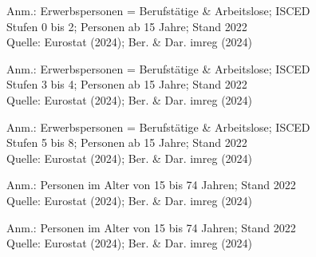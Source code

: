 \begin{figure}[p]
	{\centering {}}
	\label{map:erwerbspersniedrig}
	\begin{spacing}{1} \scriptsize
		Anm.: Erwerbspersonen = Berufstätige \& Arbeitslose; ISCED Stufen 0 bis 2; Personen ab 15 Jahre; Stand 2022\\
		Quelle: Eurostat (2024); Ber. \& Dar. imreg (2024) \end{spacing}
\end{figure}


\begin{figure}[p]
	{\centering {}}
	\label{map:erwerbspersmittel}
	\begin{spacing}{1} \scriptsize
		Anm.: Erwerbspersonen = Berufstätige \& Arbeitslose; ISCED Stufen 3 bis 4; Personen ab 15 Jahre; Stand 2022\\
		Quelle: Eurostat (2024); Ber. \& Dar. imreg (2024) \end{spacing}
\end{figure}


\begin{figure}[p]
	{\centering {}}
	\label{map:erwerbspershoch}
	\begin{spacing}{1} \scriptsize
		Anm.: Erwerbspersonen = Berufstätige \& Arbeitslose; ISCED Stufen 5 bis 8; Personen ab 15 Jahre; Stand 2022\\
		Quelle: Eurostat (2024); Ber. \& Dar. imreg (2024) \end{spacing}
\end{figure}


\begin{figure}[p]
	{\centering {}}
	\label{map:arbeitslosenquote}
	\begin{spacing}{1} \scriptsize
		Anm.: Personen im Alter von 15 bis 74 Jahren; Stand 2022\\
		Quelle: Eurostat (2024); Ber. \& Dar. imreg (2024) \end{spacing}
\end{figure}


\begin{figure}[p]
	{\centering {}}
	\label{map:arbeitslosenquotefrauen}
	\begin{spacing}{1} \scriptsize
		Anm.: Personen im Alter von 15 bis 74 Jahren; Stand 2022\\
		Quelle: Eurostat (2024); Ber. \& Dar. imreg (2024) \end{spacing}
\end{figure}


